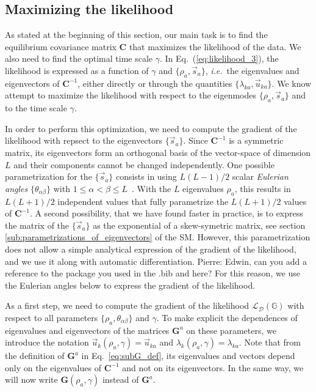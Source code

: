 \documentclass[preprint,amsmath,amssymb,superscriptaddress,showpacs,pre]{revtex4-1}
\newcommand{\ie}{\emph{i.e.}}
\newcommand{\iC}{\bm{C}^{-1}}
\newcommand{\vsa}{\vec{s}_a}
\newcommand{\vuka}{\vec{u}_{ka}}
\newcommand{\pierre}[1]{{\color{red}Pierre: #1}}
\begin{document}

\subsection{Maximizing the likelihood} %
\label{sub:maximization_of_the_likelihood}

As stated at the beginning of this section, our main task is to find the equilibrium covariance matrix $\bm C$ that maximizes the likelihood of the data. 
We also need to find the optimal time scale $\gamma$. 
In Eq.~(\eqref{eq:likelihood_3}), the likelihood is expressed as a function of $\gamma$ and $\{\rho_a, \vsa\}$, \ie~the eigenvalues and eigenvectors of $\iC$, either directly or through the quantities $\{\lambda_{ka}, \vuka \}$. 
We know attempt to maximize the likelihood with respect to the eigenmodes $\{\rho_a, \vsa\}$ and to the time scale $\gamma$. 

In order to perform this optimization, we need to compute the gradient of the likelihood with repsect to the eigenvectors $\{\vsa\}$. 
Since $\iC$ is a symmetric matrix, its eigenvectors form an orthogonal basis of the vector-space of dimension $L$ and their components cannot be changed independently.  
One possible parametrization for the $\{\vsa\}$ consists in using $L(L-1)/2$ scalar \emph{Eulerian angles} $\{\theta_{\alpha\beta}\}$ with $1\leq \alpha < \beta \leq L$~\cite{Raffenetti1970GEA, Shepard_param_OM}. 
With the $L$ eigenvalues $\rho_a$, this results in $L(L+1)/2$ independent values that fully parametrize the $L(L+1)/2$ values of $\iC$. 
A second possibility, that we have found faster in practice, is to express the matrix of the $\{\vsa\}$ as the exponential of a skew-symetric matrix, see section \ref{sub:parametrizations_of_eigenvectors} of the SM. 
However, this parametrization does not allow a simple analytical expression of the gradient of the likelihood, and we use it along with automatic differentiation. \pierre{Edwin, can you add a reference to the package you used in the .bib and here?}
For this reason, we use the Eulerian angles below to express the gradient of the likelihood. 

As a first step, we need to compute the gradient of the likelihood $\mathcal{L}_{\mathcal{D}}(\mathbb{G})$ with respect to all parameters $\{\rho_a, \theta_{\alpha\beta}\}$ and $\gamma$. 
To make explicit the dependences of eigenvalues and eigenvectors of the matrices $\bm G^a$ on these parameters, we introduce the notation $\vec{u}_k(\rho_a,\gamma) = \vuka$ and $\lambda_k(\rho_a,\gamma) = \lambda_{ka}$. 
Note that from the definition of $\bm G^a$ in Eq.~\eqref{eq:subG_def}, its eigenvalues and vectors depend only on the eigenvalues of $\iC$ and not on its eigenvectors. 
In the same way, we will now write $\bm G(\rho_a,\gamma)$ instead of $\bm G^a$. 
\end{document}
